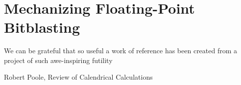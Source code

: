 \chapter{Mechanizing Floating-Point Bitblasting}
\label{ch:floating-point}
\epigraph{We can be grateful that so useful a work of reference has been created from a project of such awe-inspiring futility}{Robert Poole, Review of Calendrical Calculations}


\newcommand{\nan}{\ensuremath{\mathrm{NaN}}}
\newcommand{\baseten}[1]{\ensuremath{(#1)_{10}}}
\newcommand{\basetwo}[1]{\ensuremath{(#1)_{2}}}
\newcommand{\bitpattern}[1]{\ensuremath{\langle #1 \rangle_{2}}}
\newcommand{\pack}{\ensuremath{\mathrm{pack}}}
\newcommand{\unpack}{\ensuremath{\mathrm{unpack}}}
\newcommand{\toRat}{\ensuremath{\mathrm{toRat}}}
\newcommand{\isnan}{\ensuremath{\mathrm{isNaN}}}
\newcommand{\isinf}{\ensuremath{\mathrm{isInf}}}
\newcommand{\iszero}{\ensuremath{\mathrm{isZero}}}

\newcommand{\symfpucommit}[1]{\href{https://github.com/martin-cs/symfpu/commit/#1}{\texttt{#1}}}

\newcommand{\cmark}{\cellcolor{pairedThreeLightGreen}\ding{51}}
\newcommand{\xmark}{\cellcolor{pairedFiveLightRed}{\sffamily X}}
\newcommand{\pmark}{\cellcolor{tablePartialYellow}(\ding{51})}
\newcommand{\namark}{\cellcolor{tableRowDark}\textcolor{gray}{\footnotesize NA}}
\newcommand{\cmarkbox}{\colorbox{pairedThreeLightGreen}{\ding{51}}}
\newcommand{\xmarkbox}{\colorbox{pairedFiveLightRed}{\sffamily X}}
\newcommand{\pmarkbox}{\colorbox{tablePartialYellow}{(\ding{51})}}
\newcommand{\namarkbox}{\colorbox{tableRowDark}{\textcolor{gray}{\footnotesize NA}}}

